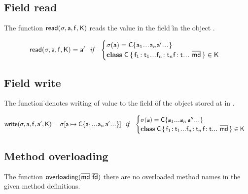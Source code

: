 \documentclass[acmlarge, anonymous, authordraft]{acmart}
\begin{document}
\subsection{Field read}

The function $\readf\s\a\f\K$ reads the value in the field \f in the object \a.

\begin{equation*}
\readf \s\a\f\K = \ap 
  ~~\mathit{if}~~ \begin{cases}  \s(\a) = \obj\C{\a_1\dots\a_n \ap \dots}\\
 \Class\C {\Fdef{\f_1}{\t_1}\dots\Fdef{\f_n}{\t_n}\Ftype\f\t\dots}{\b\md}\in\K
 \end{cases}
\end{equation*}

\subsection{Field write}

The function \setf\s\a\f\ap\K denotes writing of value \ap to the field \f of
the object stored at \a in \s.

\begin{equation*}
\setf \s\a\f\ap\K= \Map\s{\Bind{\a}{\obj\C{\a_1\dots\a_n\,\ap\dots}}}
  ~~\mathit{if}~~ \begin{cases}
   \s(\a) = \obj\C{\a_1\dots\a_n\,\app\dots}\\
   \Class\C{\Fdef{\f_1}{\t_1}\dots\Fdef{\f_n}{\t_n}\,\Fdef\f\t\dots}{\b\md}\in\K
\end{cases}
\end{equation*}

\subsection{Method overloading}

The function $\xt{overloading}(\b\md ~ \b\fd)$ there are no overloaded method names in the
given method definitions.


\begin{mathpar}


\end{mathpar}
\end{document}
